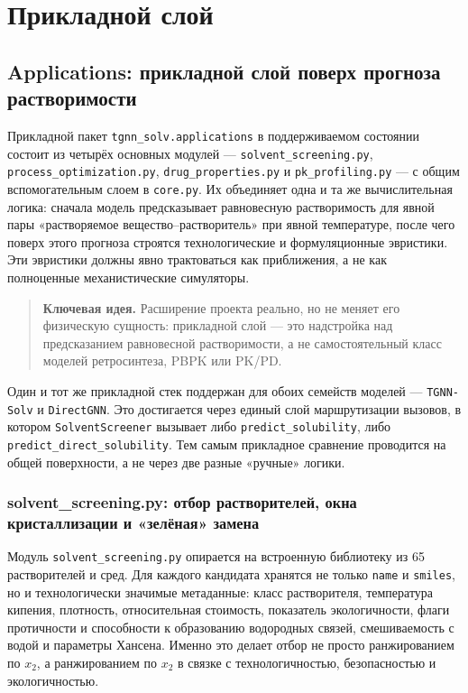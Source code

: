 \documentclass[11pt]{article}
\newcommand{\keyidea}[1]{\begin{quote}\textbf{Ключевая идея.} #1\end{quote}}
\begin{document}
\section{Прикладной слой}

\subsection{Applications: прикладной слой поверх прогноза растворимости}

Прикладной пакет \texttt{tgnn\_solv.applications} в поддерживаемом состоянии состоит из четырёх основных модулей --- \texttt{solvent\_screening.py}, \texttt{process\_optimization.py}, \texttt{drug\_properties.py} и \texttt{pk\_profiling.py} --- с общим вспомогательным слоем в \texttt{core.py}. Их объединяет одна и та же вычислительная логика: сначала модель предсказывает равновесную растворимость для явной пары «растворяемое вещество--растворитель» при явной температуре, после чего поверх этого прогноза строятся технологические и формуляционные эвристики. Эти эвристики должны явно трактоваться как приближения, а не как полноценные механистические симуляторы.

\keyidea{Расширение проекта реально, но не меняет его физическую сущность: прикладной слой --- это надстройка над предсказанием равновесной растворимости, а не самостоятельный класс моделей ретросинтеза, PBPK или PK/PD.}

Один и тот же прикладной стек поддержан для обоих семейств моделей --- \texttt{TGNN-Solv} и \texttt{DirectGNN}. Это достигается через единый слой маршрутизации вызовов, в котором \texttt{SolventScreener} вызывает либо \texttt{predict\_solubility}, либо \texttt{predict\_direct\_solubility}. Тем самым прикладное сравнение проводится на общей поверхности, а не через две разные «ручные» логики.

\subsubsection{solvent\_screening.py: отбор растворителей, окна кристаллизации и «зелёная» замена}

Модуль \texttt{solvent\_screening.py} опирается на встроенную библиотеку из 65 растворителей и сред. Для каждого кандидата хранятся не только \texttt{name} и \texttt{smiles}, но и технологически значимые метаданные: класс растворителя, температура кипения, плотность, относительная стоимость, показатель экологичности, флаги протичности и способности к образованию водородных связей, смешиваемость с водой и параметры Хансена. Именно это делает отбор не просто ранжированием по $x_2$, а ранжированием по $x_2$ в связке с технологичностью, безопасностью и экологичностью.
\end{document}
